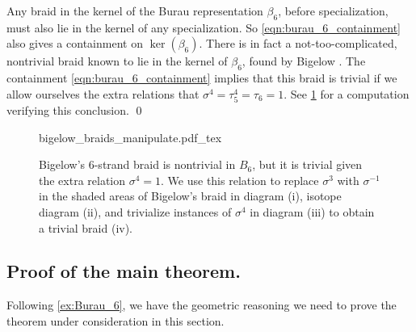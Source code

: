 \documentclass{amsart}
\begin{document}
\begin{example}[The case of $n=6$ and $d=4$]
        Any braid in the kernel of the Burau representation $\beta_6$, before specialization, must also lie in the kernel of any specialization. So \eqref{eqn:burau_6_containment} also gives a containment on $\ker( \beta_6)$. There is in fact a not-too-complicated, nontrivial braid known to lie in the kernel of $\beta_6$, found by Bigelow \cite{Bigelow1999The5}. The containment \eqref{eqn:burau_6_containment} implies that this braid is trivial if we allow ourselves the extra relations that $\sigma^4=\tau_5^4=\tau_6=1$. See \cref{fig:commutator_reduction} for a computation verifying this conclusion. \qed
        
        \begin{figure}
                \centering
                \def\svgwidth{\columnwidth}
                {bigelow_braids_manipulate.pdf_tex}
                \caption{Bigelow's 6-strand braid \cite[Figure 4]{Bigelow1999The5} is nontrivial in $B_6$, but it is trivial given the extra relation $\sigma^4=1$. We use this relation to replace $\sigma^3$ with $\sigma^{-1}$ in the shaded areas of Bigelow's braid in diagram (i), isotope diagram (ii), and trivialize instances of $\sigma^4$ in diagram (iii) to obtain a trivial braid (iv).}
                \label{fig:commutator_reduction}
        \end{figure}
    \end{example}


\subsection{Proof of the main theorem.}
    Following \cref{ex:Burau_6}, we have the geometric reasoning we need to prove the theorem under consideration in this section.
\end{document}
